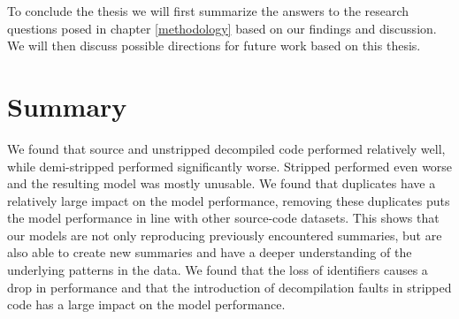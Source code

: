 To conclude the thesis we will first summarize the answers to the research questions posed in chapter \ref{methodology} based on our findings and discussion. We will then discuss possible directions for future work based on this thesis. 
\section{Summary}
We found that source and unstripped decompiled code performed relatively well, while demi-stripped performed significantly worse. Stripped performed even worse and the resulting model was mostly unusable. We found that duplicates have a relatively large impact on the model performance, removing these duplicates puts the model performance in line with other source-code datasets. This shows that our models are not only reproducing previously encountered summaries, but are also able to create new summaries and have a deeper understanding of the underlying patterns in the data. We found that the loss of identifiers causes a drop in performance and that the introduction of decompilation faults in stripped code has a large impact on the model performance.

